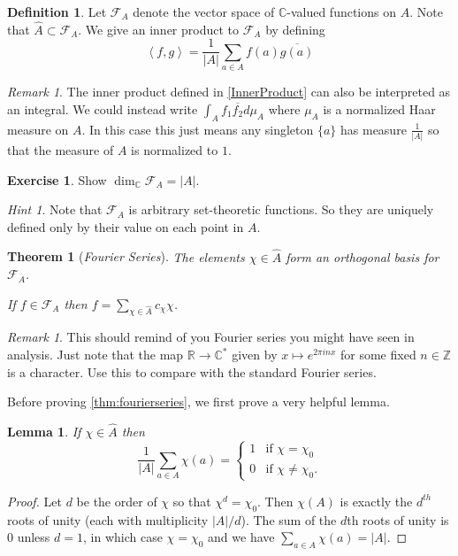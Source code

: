 \documentclass[11pt]{article}
\newcommand{\BB}[1]{\mathbb{#1}} %
\newcommand{\script}[1]{\mathcal{#1}} %
\newcommand{\free}[1]{\left\langle#1\right\rangle} %
\newcommand{\CC}{\BB{C}}
\newcommand{\RR}{\BB{R}}
\newcommand{\ZZ}{\BB{Z}}
\newcommand{\sF}{\script{F}}
\renewcommand{\hat}{\widehat}
\theoremstyle{plain}
\newtheorem{thm}[theoremcounter]{Theorem}
\newtheorem{lem}[lemmacounter]{Lemma}
\theoremstyle{definition}
\newtheorem{defn}[definitioncounter]{Definition}
\newtheorem{excer}[exercisecounter]{Exercise}
\theoremstyle{remark}
\newtheorem{rem}[remarkcounter]{Remark}
\newtheorem*{hint}{Hint}
\begin{document}
\begin{defn}\label{InnerProduct}
	Let $\sF_A$ denote the vector space of $\CC$-valued functions on $A$. Note that $\hat{A} \subset \sF_A$. We give an inner product to $\sF_A$ by defining
	$$
	\free{f,g} = \frac{1}{|A|}\sum_{a\in A}f(a)\overline{g(a)}
	$$
\end{defn}

\begin{rem}
	The inner product defined in \autoref{InnerProduct} can also be interpreted as an integral. We could instead write $\int_Af_1\overline{f_2}d\mu_A$ where $\mu_A$ is a normalized Haar measure on $A$. In this case this just means any singleton $\{a\}$ has measure $\frac{1}{|A|}$ so that the measure of $A$ is normalized to $1$.
\end{rem}

\begin{excer}\label{ex:dimsF_A}
	Show $\dim_\CC\sF_A = |A|$.
	\begin{hint}
		Note that $\sF_A$ is arbitrary set-theoretic functions. So they are uniquely defined only by their value on each point in $A$.
	\end{hint}
\end{excer}

\begin{thm}[\emph{Fourier Series}]\label{thm:fourierseries}
	The elements $\chi\in\hat{A}$ form an orthogonal basis for $\sF_A$.

	If $f\in\sF_A$ then $f = \sum\limits_{\chi\in\hat{A}}c_{\chi}\chi$.
\end{thm}

\begin{rem}
	This should remind of you Fourier series you might have seen in analysis. Just note that the map $\RR\to\CC^*$ given by $x\mapsto e^{2\pi i n x}$ for some fixed $n\in\ZZ$ is a character. Use this to compare with the standard Fourier series.
\end{rem}

Before proving \autoref{thm:fourierseries}, we first prove a very helpful lemma.

\begin{lem}\label{lem:ortholemma}
	If $\chi\in\hat{A}$ then
	$$
	\frac{1}{|A|}\sum_{a\in A}\chi(a) =
	\begin{cases}
		1 &\text{if $\chi=\chi_0$}
		\\
		0 &\text{if $\chi\neq\chi_0$.}
	\end{cases}
	$$
\end{lem}
\begin{proof}
	Let $d$ be the order of $\chi$ so that $\chi^d = \chi_0$. Then $\chi(A)$ is exactly the $d^{th}$ roots of unity (each with multiplicity $|A|/d$). The sum of the $d$th roots of unity is $0$ unless $d=1$, in which case $\chi=\chi_0$ and we have $\sum_{a\in A}\chi(a) = |A|$.
\end{proof}
\end{document}

